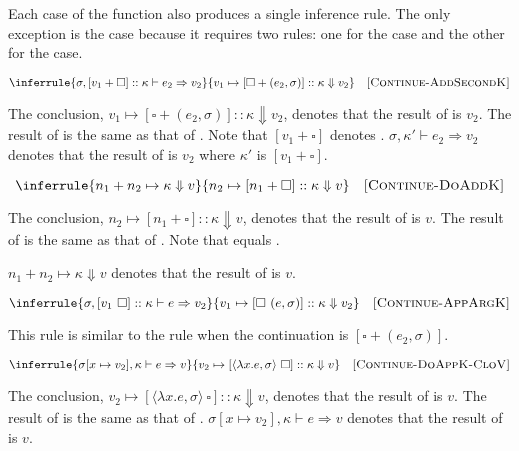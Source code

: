 Each case of the  function also produces a single inference rule.
The only exception is the  case because it requires two rules: one
for the  case and the other for the  case.

\[
  \inferrule
  { \sigma,[v_1+\square]::\kappa\vdash e_2\Rightarrow v_2 }
  { v_1\mapsto[\square+(e_2,\sigma)]::\kappa\Downarrow v_2 }
  \quad\textsc{[Continue-AddSecondK]}
\]

The conclusion, $v_1\mapsto[\square+(e_2,\sigma)]::\kappa\Downarrow v_2$, denotes
that the result of 
is $v_2$. The result of  is the same as that of . Note that $[v_1+\square]$ denotes .
$\sigma,\kappa'\vdash e_2\Rightarrow v_2$ denotes that the result of
 is $v_2$ where $\kappa'$ is $[v_1+\square]$.

\[
  \inferrule
  { n_1+n_2\mapsto\kappa\Downarrow v }
  { n_2\mapsto[n_1+\square]::\kappa\Downarrow v }
  \quad\textsc{[Continue-DoAddK]}
\]

The conclusion, $n_2\mapsto[n_1+\square]::\kappa\Downarrow v$, denotes that the
result of  is $v$. The result of  is the same as that of . Note that  equals .

$n_1+n_2\mapsto\kappa\Downarrow v$ denotes that the result of
 is $v$.

\[
  \inferrule
  { \sigma,[v_1\ \square]::\kappa\vdash e\Rightarrow v_2 }
  { v_1\mapsto[\square\ (e,\sigma)]::\kappa\Downarrow v_2 }
  \quad\textsc{[Continue-AppArgK]}
\]

This rule is similar to the rule when the continuation is
$[\square+(e_2,\sigma)]$.

\[
  \inferrule
  { \sigma[x\mapsto v_2],\kappa\vdash e\Rightarrow v }
  { v_2\mapsto[\langle\lambda x.e,\sigma\rangle\ \square]::\kappa\Downarrow v }
  \quad\textsc{[Continue-DoAppK-CloV]}
\]

The conclusion, $v_2\mapsto[\langle\lambda x.e,\sigma\rangle\
\square]::\kappa\Downarrow v$, denotes that the result of
 is $v$. The result of
\code{continue(DoAppK(CloV($x$, $e$, $\sigma$), $\kappa$), $v_2$)} is the same as that
of . $\sigma[x\mapsto
v_2],\kappa\vdash e\Rightarrow v$ denotes that the result of \code{interp($e$,
$\sigma[x\mapsto v_2]$, $\kappa$)} is $v$.

